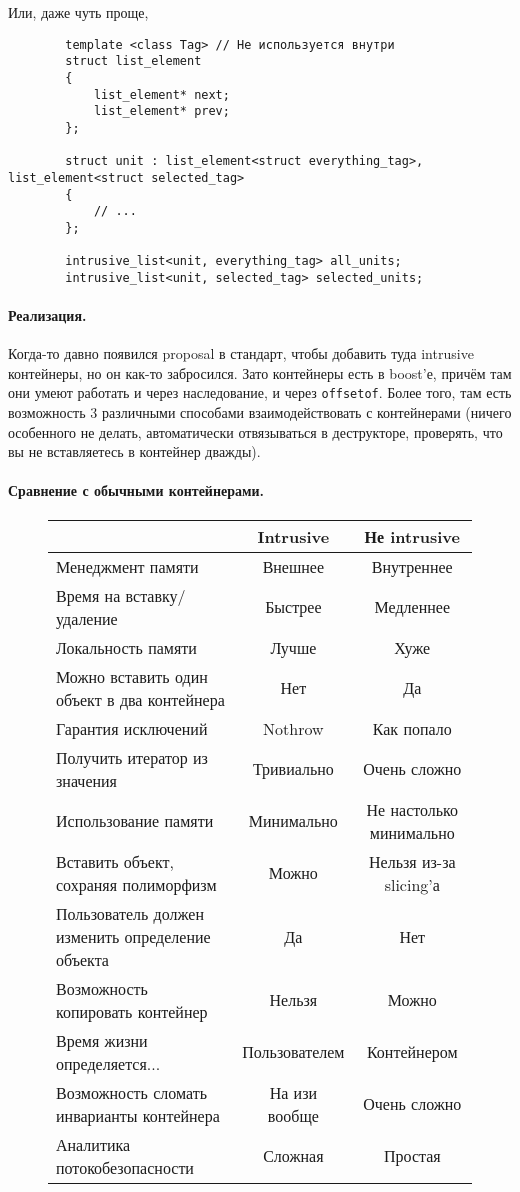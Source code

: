 \documentclass{article}
\begin{document}
    Или, даже чуть проще,
    \begin{verbatim}
        template <class Tag> // Не используется внутри
        struct list_element
        {
            list_element* next;
            list_element* prev;
        };
        
        struct unit : list_element<struct everything_tag>, list_element<struct selected_tag>
        {
            // ...
        };
        
        intrusive_list<unit, everything_tag> all_units;
        intrusive_list<unit, selected_tag> selected_units;
    \end{verbatim}
    \paragraph{Реализация.}
    Когда-то давно появился proposal в стандарт, чтобы добавить туда intrusive контейнеры, но он как-то забросился. Зато контейнеры есть в boost'е, причём там они умеют работать и через наследование, и через \texttt{offsetof}. Более того, там есть возможность 3 различными способами взаимодействовать с контейнерами (ничего особенного не делать, автоматически отвязываться в деструкторе, проверять, что вы не вставляетесь в контейнер дважды).
    \paragraph{Сравнение с обычными контейнерами.}\mbox{}
    \begin{figure}[H]
        \begin{tabular}{|l|cc|}
            \hline
            & Intrusive & Не intrusive\\
            \hline
            Менеджмент памяти & Внешнее & Внутреннее\\
            Время на вставку/удаление & Быстрее & Медленнее\\
            Локальность памяти & Лучше & Хуже\\
            Можно вставить один объект в два контейнера & Нет & Да\\
            Гарантия исключений & Nothrow & Как попало\\
            Получить итератор из значения & Тривиально & Очень сложно\\
            Использование памяти & Минимально & Не настолько минимально\\
            Вставить объект, сохраняя полиморфизм & Можно & Нельзя из-за slicing'а\\
            Пользователь должен изменить определение объекта & Да & Нет\\
            Возможность копировать контейнер & Нельзя & Можно\\
            Время жизни определяется...  & Пользователем & Контейнером\\
            Возможность сломать инварианты контейнера & На изи вообще & Очень сложно\\
            Аналитика потокобезопасности & Сложная & Простая\\
            \hline
        \end{tabular}
    \end{figure}
\end{document}
